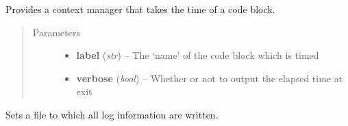 \documentclass[letterpaper,10pt,english]{sphinxmanual}
\begin{document}

\begin{fulllineitems}
\label{pytrajectory:pytrajectory.log.Timer}
Provides a context manager that takes the time of a code block.
\begin{quote}\begin{description}
\item[{Parameters}] \leavevmode\begin{itemize}
\item {} 
\textbf{label} (\emph{str}) -- The `name' of the code block which is timed

\item {} 
\textbf{verbose} (\emph{bool}) -- Whether or not to output the elapsed time at exit

\end{itemize}

\end{description}\end{quote}

\end{fulllineitems}


\begin{fulllineitems}
\label{pytrajectory:pytrajectory.log.set_file}
Sets a file to which all log information are written.

\end{fulllineitems}


\begin{fulllineitems}
\label{pytrajectory:pytrajectory.log.msg}
\end{fulllineitems}


\begin{fulllineitems}
\label{pytrajectory:pytrajectory.log.info}
\end{fulllineitems}
\end{document}
